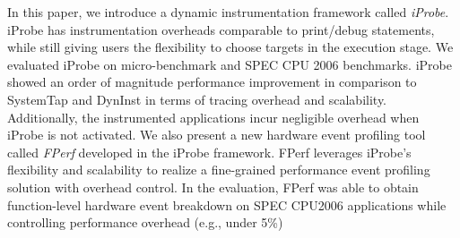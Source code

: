 In this paper, we introduce a dynamic instrumentation framework called \emph{iProbe}.
iProbe has instrumentation overheads comparable to print/debug statements, while still giving users the flexibility to choose targets in the execution stage. 
We evaluated iProbe on micro-benchmark and SPEC CPU 2006 benchmarks.
iProbe showed an order of magnitude performance improvement in comparison to SystemTap\cite{utrace} and DynInst\cite{dyninst} 
in terms of tracing overhead and scalability.
Additionally, the instrumented applications incur 
negligible overhead when iProbe is not activated.
We also present a new hardware event profiling tool called \emph{FPerf} 
developed in the iProbe framework.  
FPerf leverages iProbe's flexibility and scalability to realize 
a fine-grained performance event profiling solution with overhead control.
In the evaluation, FPerf was able to obtain function-level
hardware event breakdown on SPEC CPU2006 applications 
while controlling performance overhead (e.g., under 5\%)




